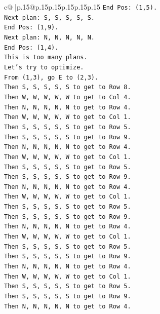 \documentclass{article}
\begin{document}
{\begin{supertabular}{c@{$\;$}|p{.15\linewidth}@{}p{.15\linewidth}p{.15\linewidth}p{.15\linewidth}p{.15\linewidth}p{.15\linewidth}}
{{{\texttt{End Pos: (1,5).} \\
\texttt{Next plan: S, S, S, S, S.} \\
\texttt{End Pos: (1,9).} \\
\texttt{Next plan: N, N, N, N, N.} \\
\texttt{End Pos: (1,4).} \\
\texttt{This is too many plans.} \\
\texttt{Let's try to optimize.} \\
\texttt{From (1,3), go E to (2,3).} \\
\texttt{Then S, S, S, S, S to get to Row 8.} \\
\texttt{Then W, W, W, W, W to get to Col 4.} \\
\texttt{Then N, N, N, N, N to get to Row 4.} \\
\texttt{Then W, W, W, W, W to get to Col 1.} \\
\texttt{Then S, S, S, S, S to get to Row 5.} \\
\texttt{Then S, S, S, S, S to get to Row 9.} \\
\texttt{Then N, N, N, N, N to get to Row 4.} \\
\texttt{Then W, W, W, W, W to get to Col 1.} \\
\texttt{Then S, S, S, S, S to get to Row 5.} \\
\texttt{Then S, S, S, S, S to get to Row 9.} \\
\texttt{Then N, N, N, N, N to get to Row 4.} \\
\texttt{Then W, W, W, W, W to get to Col 1.} \\
\texttt{Then S, S, S, S, S to get to Row 5.} \\
\texttt{Then S, S, S, S, S to get to Row 9.} \\
\texttt{Then N, N, N, N, N to get to Row 4.} \\
\texttt{Then W, W, W, W, W to get to Col 1.} \\
\texttt{Then S, S, S, S, S to get to Row 5.} \\
\texttt{Then S, S, S, S, S to get to Row 9.} \\
\texttt{Then N, N, N, N, N to get to Row 4.} \\
\texttt{Then W, W, W, W, W to get to Col 1.} \\
\texttt{Then S, S, S, S, S to get to Row 5.} \\
\texttt{Then S, S, S, S, S to get to Row 9.} \\
\texttt{Then N, N, N, N, N to get to Row 4.} \\
}}}
\end{supertabular}}
\end{document}
